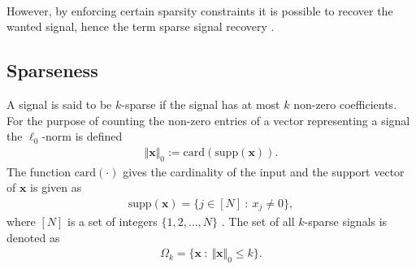\\
However, by enforcing certain sparsity constraints it is possible to recover the wanted signal, hence the term sparse signal recovery \cite{FR}.

\subsection{Sparseness} 
A signal is said to be $k$-sparse if the signal has at most $k$ non-zero coefficients. For the purpose of counting the non-zero entries of a vector representing a signal the $\ell_0$-norm is defined
\begin{align*}
\Vert \mathbf{x} \Vert_0 := \text{card}(\text{supp}(\mathbf{x})).
\end{align*}
The function $\text{card}(\cdot)$ gives the cardinality of the input and the support vector of $\mathbf{x}$ is given as
\begin{align*}
\text{supp}(\mathbf{x}) = \{ j \in [N] \ : \ x_j \neq 0 \},
\end{align*} 
where $[N]$ is a set of integers $\{1,2,\hdots,N\}$ \cite[p. 41]{FR}. The set of all $k$-sparse signals is denoted as
\begin{align*}
\Omega_k = \{ \mathbf{x} \ : \ \Vert \mathbf{x} \Vert_0 \leq k \}.
\end{align*}

